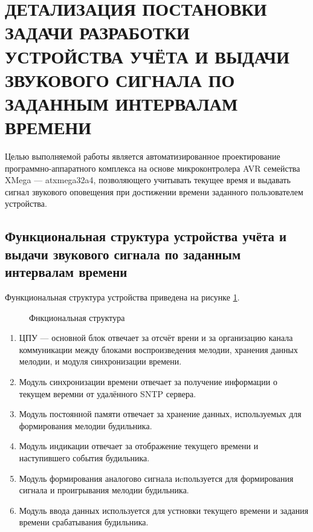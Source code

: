 \section{ДЕТАЛИЗАЦИЯ ПОСТАНОВКИ ЗАДАЧИ РАЗРАБОТКИ УСТРОЙСТВА УЧЁТА И ВЫДАЧИ ЗВУКОВОГО СИГНАЛА
ПО ЗАДАННЫМ ИНТЕРВАЛАМ ВРЕМЕНИ}
\begin{par}
Целью выполняемой работы является автоматизированное проектирование программно-аппаратного комплекса
на основе микроконтролера AVR семейства XMega --- atxmega32a4, позволяющего учитывать текущее время
и выдавать сигнал звукового оповещения при достижении времени заданного пользователем устройства.
\end{par}

\subsection{Функциональная структура устройства учёта и выдачи звукового сигнала по заданным интервалам времени}

Функциональная структура устройства приведена на рисунке \ref{img:funcd}.

\begin{figure}[h]
	\caption{Фнкциональная структура}
	\label{img:funcd}
\end{figure}

\begin{enumerate}
    \item{}ЦПУ --- основной блок отвечает за отсчёт врени и за организацию канала коммуникации
        между блоками воспроизведения мелодии, хранения данных мелодии, и модуля синхронизации времени.
    \item{}Модуль синхронизации времени отвечает за получение информации о текущем веремни
            от удалённого SNTP сервера.
    \item{}Модуль постоянной памяти отвечает за хранение данных, используемых для формирования
        мелодии будильника.
    \item{}Модуль индикации отвечает за отображение текущего времени и наступившего события
        будильника.
    \item{}Модуль формирования аналогово сигнала иcпользуется для формирования сигнала и проигрывания
            мелодии будильника.
    \item{}Модуль ввода данных используется для устновки текущего времени и задания
        времени срабатывания будильника.
\end{enumerate}


